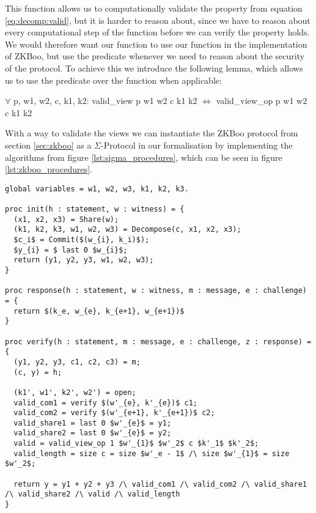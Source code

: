 This function allows us to computationally validate the property from equation
\ref{eq:decomp:valid}, but it is harder to reason about, since we have
to reason about every computational step of the function before we can verify
the property holds. We would therefore want our function to use our function in
the implementation of ZKBoo, but use the predicate whenever we need to reason
about the security of the protocol. To achieve this we introduce the following
lemma, which allows us to use the predicate over the function when applicable:
\begin{lemma}
  $\forall$ p, w1, w2, c, k1, k2:
  valid\_view p w1 w2 c k1 k2 $\iff$ valid\_view\_op p w1 w2 c k1 k2
\end{lemma}

With a way to validate the views we can instantiate the ZKBoo protocol from
section \ref{sec:zkboo} as a $\Sigma$-Protocol in our formalisation by
implementing the algorithms from figure \ref{lst:sigma_procedures}, which can be
seen in figure \ref{lst:zkboo_procedures}.

\begin{lstlisting}[float, mathescape,label=lst:zkboo_procedures,caption= ZKBoo $\Sigma$-Protocol instantiation]
global variables = w1, w2, w3, k1, k2, k3.

proc init(h : statement, w : witness) = {
  (x1, x2, x3) = Share(w);
  (k1, k2, k3, w1, w2, w3) = Decompose(c, x1, x2, x3);
  $c_i$ = Commit($(w_{i}, k_i)$);
  $y_{i} = $ last 0 $w_{i}$;
  return (y1, y2, y3, w1, w2, w3);
}

proc response(h : statement, w : witness, m : message, e : challenge) = {
  return $(k_e, w_{e}, k_{e+1}, w_{e+1})$
}

proc verify(h : statement, m : message, e : challenge, z : response) = {
  (y1, y2, y3, c1, c2, c3) = m;
  (c, y) = h;

  (k1', w1', k2', w2') = open;
  valid_com1 = verify $(w'_{e}, k'_{e})$ c1;
  valid_com2 = verify $(w'_{e+1}, k'_{e+1})$ c2;
  valid_share1 = last 0 $w'_{e}$ = y1;
  valid_share2 = last 0 $w'_{e}$ = y2;
  valid = valid_view_op 1 $w'_{1}$ $w'_2$ c $k'_1$ $k'_2$;
  valid_length = size c = size $w'_e - 1$ /\ size $w'_{1}$ = size $w'_2$;

  return y = y1 + y2 + y3 /\ valid_com1 /\ valid_com2 /\ valid_share1 /\ valid_share2 /\ valid /\ valid_length
}

\end{lstlisting}

